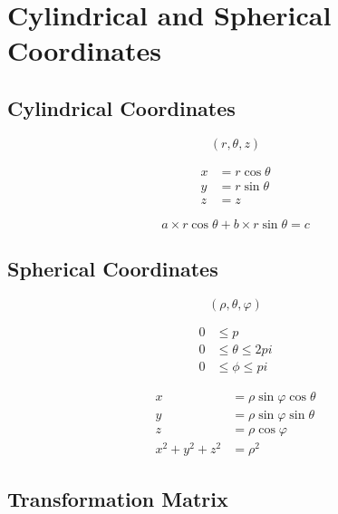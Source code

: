\section{Cylindrical and Spherical Coordinates}

  \subsection{Cylindrical Coordinates}

    \begin{equation}
      \left( r, \theta, z \right)
    \end{equation}

    \begin{align}
      x &= r \cos\theta \\
      y &= r \sin\theta \\
      z &= z
    \end{align}

    \begin{equation}
      a \times r \cos\theta + b \times r \sin\theta = c
    \end{equation}

  \subsection{Spherical Coordinates}

    \begin{equation}
      \left( \rho, \theta, \varphi \right)
    \end{equation}

    \begin{align}
      0 &\le p \\
      0 &\le \theta \le 2 pi \\
      0 &\le \phi \le pi
    \end{align}

    \begin{align}
      x &= \rho \sin\varphi \cos\theta \\
      y &= \rho \sin\varphi \sin\theta \\
      z &= \rho \cos\varphi \\
      x^{2} + y^{2} + z^{2} &= \rho^{2}
    \end{align}

  \subsection{Transformation Matrix}


